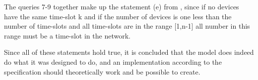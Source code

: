 The queries 7-9 together make up the statement (e) from , since if no devices have the same time-slot k and if the number of devices is one less than the number of time-slots and all time-slots are in the range [1,n-1] all number in this range must be a time-slot in the network.

Since all of these statements hold true, it is concluded that the model does indeed do what it was designed to do, and an implementation according to the specification should theoretically work and be possible to create.
